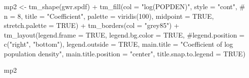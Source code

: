 \documentclass[
  letterpaper,
]{scrbook}
\newenvironment{Shaded}{\begin{snugshade}}{\end{snugshade}}
\newcommand{\AttributeTok}[1]{\textcolor[rgb]{0.40,0.45,0.13}{#1}}
\newcommand{\CommentTok}[1]{\textcolor[rgb]{0.37,0.37,0.37}{#1}}
\newcommand{\ConstantTok}[1]{\textcolor[rgb]{0.56,0.35,0.01}{#1}}
\newcommand{\DecValTok}[1]{\textcolor[rgb]{0.68,0.00,0.00}{#1}}
\newcommand{\FunctionTok}[1]{\textcolor[rgb]{0.28,0.35,0.67}{#1}}
\newcommand{\NormalTok}[1]{\textcolor[rgb]{0.00,0.23,0.31}{#1}}
\newcommand{\OtherTok}[1]{\textcolor[rgb]{0.00,0.23,0.31}{#1}}
\newcommand{\SpecialCharTok}[1]{\textcolor[rgb]{0.37,0.37,0.37}{#1}}
\newcommand{\StringTok}[1]{\textcolor[rgb]{0.13,0.47,0.30}{#1}}
\begin{document}
\begin{Shaded}
\begin{Highlighting}[]
\NormalTok{mp2 }\OtherTok{\textless{}{-}} \FunctionTok{tm\_shape}\NormalTok{(gwr.spdf) }\SpecialCharTok{+}
  \FunctionTok{tm\_fill}\NormalTok{(}\AttributeTok{col =} \StringTok{"log(POPDEN)"}\NormalTok{, }
          \AttributeTok{style =} \StringTok{"cont"}\NormalTok{, }
          \CommentTok{\# n = 8,}
          \AttributeTok{title =} \StringTok{"Coefficient"}\NormalTok{, }
          \AttributeTok{palette =} \FunctionTok{viridis}\NormalTok{(}\DecValTok{100}\NormalTok{),}
          \AttributeTok{midpoint =} \ConstantTok{TRUE}\NormalTok{, }\AttributeTok{stretch.palette =} \ConstantTok{TRUE}\NormalTok{) }\SpecialCharTok{+}
  \FunctionTok{tm\_borders}\NormalTok{(}\AttributeTok{col =} \StringTok{"grey85"}\NormalTok{) }\SpecialCharTok{+}
  \FunctionTok{tm\_layout}\NormalTok{(}\AttributeTok{legend.frame =} \ConstantTok{TRUE}\NormalTok{, }\AttributeTok{legend.bg.color =} \ConstantTok{TRUE}\NormalTok{,}
            \CommentTok{\#legend.position = c("right", "bottom"),}
            \AttributeTok{legend.outside =} \ConstantTok{TRUE}\NormalTok{,}
            \AttributeTok{main.title =} \StringTok{"Coefficient of log population density"}\NormalTok{, }
            \AttributeTok{main.title.position =} \StringTok{"center"}\NormalTok{,}
            \AttributeTok{title.snap.to.legend =} \ConstantTok{TRUE}\NormalTok{) }

\NormalTok{mp2 }
\end{Highlighting}
\end{Shaded}
\end{document}
